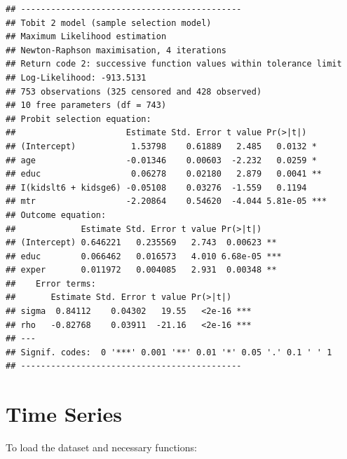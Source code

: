 \documentclass[]{book}
\begin{document}
\begin{verbatim}
## --------------------------------------------
## Tobit 2 model (sample selection model)
## Maximum Likelihood estimation
## Newton-Raphson maximisation, 4 iterations
## Return code 2: successive function values within tolerance limit
## Log-Likelihood: -913.5131 
## 753 observations (325 censored and 428 observed)
## 10 free parameters (df = 743)
## Probit selection equation:
##                      Estimate Std. Error t value Pr(>|t|)    
## (Intercept)           1.53798    0.61889   2.485   0.0132 *  
## age                  -0.01346    0.00603  -2.232   0.0259 *  
## educ                  0.06278    0.02180   2.879   0.0041 ** 
## I(kidslt6 + kidsge6) -0.05108    0.03276  -1.559   0.1194    
## mtr                  -2.20864    0.54620  -4.044 5.81e-05 ***
## Outcome equation:
##             Estimate Std. Error t value Pr(>|t|)    
## (Intercept) 0.646221   0.235569   2.743  0.00623 ** 
## educ        0.066462   0.016573   4.010 6.68e-05 ***
## exper       0.011972   0.004085   2.931  0.00348 ** 
##    Error terms:
##       Estimate Std. Error t value Pr(>|t|)    
## sigma  0.84112    0.04302   19.55   <2e-16 ***
## rho   -0.82768    0.03911  -21.16   <2e-16 ***
## ---
## Signif. codes:  0 '***' 0.001 '**' 0.01 '*' 0.05 '.' 0.1 ' ' 1
## --------------------------------------------
\end{verbatim}

\hypertarget{timeseries}{%
\chapter{Time Series}\label{timeseries}}

To load the dataset and necessary functions:
\end{document}
